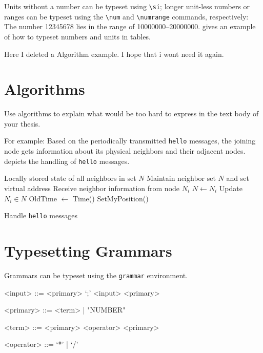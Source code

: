 \documentclass[]{ccs-thesis}
\begin{document}
{Units without a number can be typeset using \verb|\si|; longer unit-less numbers or ranges can be typeset using the \verb|\num| and \verb|\numrange| commands, respectively: The number \num{12345678} lies in the range of \numrange{10000000}{20000000}.
 gives an example of how to typeset numbers and units in tables.

Here I deleted a Algorithm example. I hope that i wont need it again.

\clearpage
\section{Algorithms}

Use algorithms to explain what would be too hard to express in the text body of your thesis.

For example: Based on the periodically transmitted \texttt{hello} messages, the joining node gets information about its physical neighbors and their adjacent nodes.
 depicts the handling of \texttt{hello} messages.

\begin{algorithm}
\begin{algorithmic}[1]
\REQUIRE Locally stored state of all neighbors in set $N$
\ENSURE Maintain neighbor set $N$ and set virtual address
\STATE Receive neighbor information from node $N_i$
	\STATE $N \gets N_i$
\ELSE
	\STATE Update $N_i \in N$
\ENDIF
{}
	\STATE OldTime $\gets$ Time()
	\STATE SetMyPosition()
\ENDIF
\end{algorithmic}
\caption{Handle \texttt{hello} messages}
\label{alg:H_hello}
\end{algorithm}

\clearpage
\section{Typesetting Grammars}

Grammars can be typeset using the \texttt{grammar} environment.

\begin{grammar}\label{stx:demo}

<input> ::= <primary> `;' <input> \alt <primary> \alt \empty

<primary> ::= <term> | "NUMBER"

<term> ::= <primary> <operator> <primary>

<operator> ::= `*' | `/'


\end{grammar}}
\end{document}
